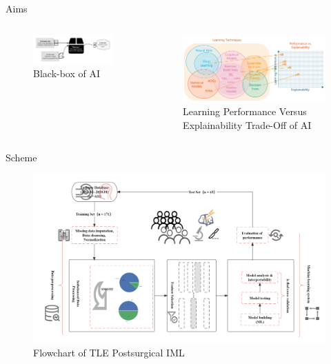 \documentclass[
  10pt,
  ignorenonframetext,
  fontset=fandol]{beamer}
\begin{document}
\begin{frame}{Aims}
\protect\hypertarget{aims}{}
\begin{columns}
\begin{figure}
\centering
\includegraphics[width=5.5cm]{images/Black-box.png}
\caption{Black-box of AI}
\end{figure}
\begin{figure}
\centering
\includegraphics[width=6.3cm]{images/xai.png}
\caption{Learning Performance Versus Explainability Trade-Off of AI}
\end{figure}
\end{columns}
\end{frame}

\begin{frame}{Scheme}
\protect\hypertarget{scheme}{}
\begin{figure}

{\centering \includegraphics[width=0.85\linewidth]{images/TLE_EML_Flow} 

}

\caption{Flowchart of TLE Postsurgical IML}\label{fig:unnamed-chunk-3}
\end{figure}
\end{frame}
\end{document}
